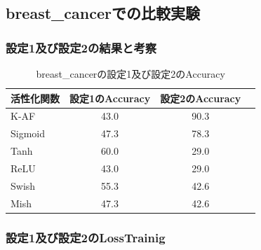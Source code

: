 \subsection{breast\_cancerでの比較実験}
\label{ev:breastcancer}

\subsubsection{設定1及び設定2の結果と考察}


\begin{table}[htbp]
    \begin{center}
        \caption{breast\_cancerの設定1及び設定2のAccuracy}
        \vspace{2mm} 
        \begin{tabular}{l*{2}{c}r}
            活性化関数              & 設定1のAccuracy &  設定2のAccuracy \\
            \hline
            K-AF            & 43.0 & 90.3 \\
            Sigmoid            & 47.3 & 78.3\\
            Tanh            & 60.0 & 29.0\\
            ReLU        & 43.0 & 29.0\\
            Swish           & 55.3 & 42.6\\
            Mish           & 47.3 & 42.6\\
    
        \end{tabular}
    \end{center}
\end{table}




\subsubsection{設定1及び設定2のLossTrainig}
\label{breastcancer:loss}

